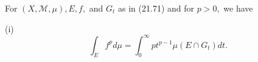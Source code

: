 For $(X, \mathcal{M}, \mu), E, f,$ and $G_t$ as in (21.71) and for $p > 0,$ we have

(i) $$\int_E f^p d\mu = \int_0^\infty p t^{p-1} \mu(E \cap G_t) dt.$$